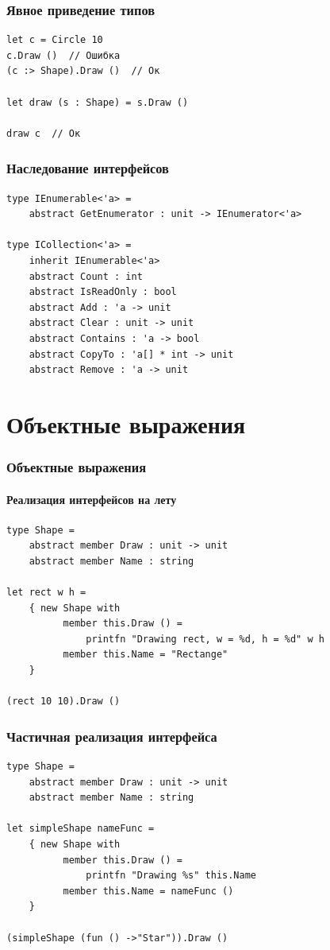 \documentclass{../../slides-style}
\begin{document}
    \begin{frame}[fragile]
        \frametitle{Явное приведение типов}
        \begin{verbatim}
let c = Circle 10
c.Draw ()  // Ошибка
(c :> Shape).Draw ()  // Ок

let draw (s : Shape) = s.Draw ()

draw c  // Ок
        \end{verbatim}
    \end{frame}

    \begin{frame}[fragile]
        \frametitle{Наследование интерфейсов}
        \begin{verbatim}
type IEnumerable<'a> =
    abstract GetEnumerator : unit -> IEnumerator<'a>

type ICollection<'a> =
    inherit IEnumerable<'a>
    abstract Count : int
    abstract IsReadOnly : bool
    abstract Add : 'a -> unit
    abstract Clear : unit -> unit
    abstract Contains : 'a -> bool
    abstract CopyTo : 'a[] * int -> unit
    abstract Remove : 'a -> unit
        \end{verbatim}
    \end{frame}

    \section{Объектные выражения}

    \begin{frame}[fragile]
        \frametitle{Объектные выражения}
        \framesubtitle{Реализация интерфейсов на лету}
        \begin{verbatim}
type Shape =
    abstract member Draw : unit -> unit
    abstract member Name : string

let rect w h = 
    { new Shape with
          member this.Draw () = 
              printfn "Drawing rect, w = %d, h = %d" w h
          member this.Name = "Rectange"
    }

(rect 10 10).Draw ()
        \end{verbatim}
    \end{frame}

    \begin{frame}[fragile]
        \frametitle{Частичная реализация интерфейса}
        \begin{verbatim}
type Shape =
    abstract member Draw : unit -> unit
    abstract member Name : string

let simpleShape nameFunc = 
    { new Shape with
          member this.Draw () = 
              printfn "Drawing %s" this.Name
          member this.Name = nameFunc ()
    }

(simpleShape (fun () ->"Star")).Draw ()
        \end{verbatim}
    \end{frame}
\end{document}
